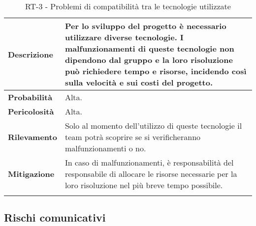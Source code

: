 
\begin{longtable}{ | l | p{12cm} | }
	\hline
	\textbf{Descrizione}  & Per lo sviluppo del progetto è necessario utilizzare diverse tecnologie. I malfunzionamenti di queste tecnologie non dipendono dal gruppo e la loro risoluzione può richiedere tempo e risorse, incidendo così sulla velocità e sui costi del progetto. \\
	\hline
	\textbf{Probabilità}  & Alta.                                                                                                                                                                                                                                                   \\
	\hline
	\textbf{Pericolosità} & Alta.                                                                                                                                                                                                                                                   \\
	\hline
	\textbf{Rilevamento}  & Solo al momento dell'utilizzo di queste tecnologie il team potrà scoprire se si verificheranno malfunzionamenti o no.                                                                                                                                   \\
	\hline
	\textbf{Mitigazione}  & In caso di malfunzionamenti, è responsabilità del responsabile di allocare le risorse necessarie per la loro risoluzione nel più breve tempo possibile.                                                                                                 \\
	\hline
	\caption{RT-3 - Problemi di compatibilità tra le tecnologie utilizzate}
	\label{table:7}
\end{longtable}


\newpage


\subsection{Rischi comunicativi}



